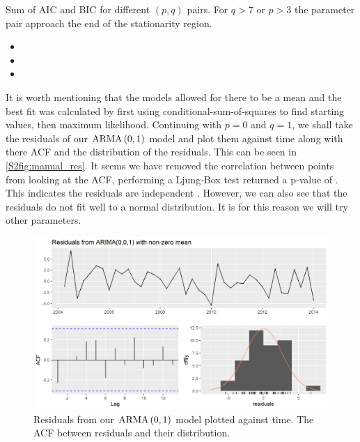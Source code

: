 \begin{table}[H]
    \begin{center}
    \end{center}
    \caption{Sum of AIC and BIC for different $(p,q)$ pairs. For $q > 7$ or $p > 3$ the parameter pair approach the end of the stationarity region.}
    \label{S2:tab_sum}
\end{table}

\begin{itemize}
    \item 
    \item 
    \item 
\end{itemize}

It is worth mentioning that the models allowed for there to be a mean and the best fit was calculated by first using conditional-sum-of-squares to find starting values, then maximum likelihood.
\nline
Continuing with $p = 0$ and $q=1$, we shall take the residuals of our $\text{ARMA}\left(0,1\right)$ model and plot them against time along with there ACF and the distribution of the residuals. This can be seen in \autoref{S2fig:manual_res}. It seems we have removed the correlation between points from looking at the ACF, performing a Ljung-Box test returned a p-value of . This indicates the residuals are independent \cite{10.1093/biomet/65.2.297}. However, we can also see that the residuals do not fit well to a normal distribution. It is for this reason we will try other parameters.

\begin{figure}[H]
    \centering
    \includegraphics[width=\sTwoRes\textwidth]{Sections/ARIMA/Plots/manual_res.png}
    \caption{Residuals from our $\text{ARMA}\left(0,1\right)$ model plotted against time. The ACF between residuals and their distribution.}
    \label{S2fig:manual_res}
\end{figure}

